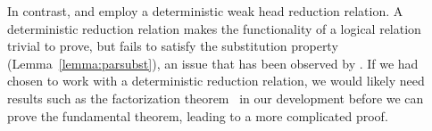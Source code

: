 \documentclass[\ifpublic nolinenum\else\fi,online,OA]{jfp}
\theoremstyle{definition}
\begin{document}
In contrast, \citet{decagda} and \citet{nbeincoq} employ a deterministic weak
head reduction relation. %
A deterministic reduction relation makes
the functionality of a logical relation trivial to prove, but fails to
satisfy the substitution property (Lemma~\ref{lemma:parsubst}), an
issue that has been observed by
\citet{casinghino:combining-proofs-programs}. If we had chosen to work
with a deterministic reduction relation, we would likely need
results such as the factorization
theorem~\citep{takahashi-parallel-reduction,factorization-essentially}
in our development before we can prove the fundamental theorem,
leading to a more complicated proof.



\end{document}
